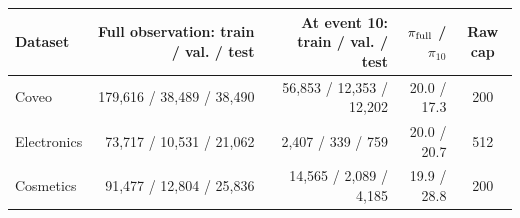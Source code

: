 \begin{revblock}
\begin{tabular}{@{}lrrrc@{}}
\toprule
Dataset & Full observation: train / val. / test & At event 10: train / val. / test & $\pi_{\rm full}$ / $\pi_{10}$ & Raw cap \\
\midrule
Coveo & 179,616 / 38,489 / 38,490 & 56,853 / 12,353 / 12,202 & 20.0 / 17.3 & 200 \\
Electronics & 73,717 / 10,531 / 21,062 & 2,407 / 339 / 759 & 20.0 / 20.7 & 512 \\
Cosmetics & 91,477 / 12,804 / 25,836 & 14,565 / 2,089 / 4,185 & 19.9 / 28.8 & 200 \\
\bottomrule
\end{tabular}
\end{revblock}
